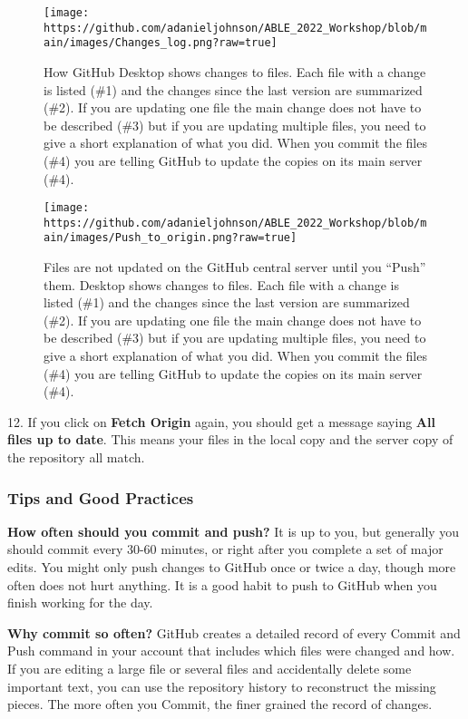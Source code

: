 \documentclass[
]{article}
\begin{document}
\begin{figure}
\centering
\texttt{[image: https://github.com/adanieljohnson/ABLE\_2022\_Workshop/blob/main/images/Changes\_log.png?raw=true]}
\caption{How GitHub Desktop shows changes to files. Each file with a
change is listed (\#1) and the changes since the last version are
summarized (\#2). If you are updating one file the main change does not
have to be described (\#3) but if you are updating multiple files, you
need to give a short explanation of what you did. When you commit the
files (\#4) you are telling GitHub to update the copies on its main
server (\#4).}
\end{figure}

\begin{figure}
\centering
\texttt{[image: https://github.com/adanieljohnson/ABLE\_2022\_Workshop/blob/main/images/Push\_to\_origin.png?raw=true]}
\caption{Files are not updated on the GitHub central server until you
``Push'' them. Desktop shows changes to files. Each file with a change
is listed (\#1) and the changes since the last version are summarized
(\#2). If you are updating one file the main change does not have to be
described (\#3) but if you are updating multiple files, you need to give
a short explanation of what you did. When you commit the files (\#4) you
are telling GitHub to update the copies on its main server (\#4).}
\end{figure}

12. If you click on \textbf{Fetch Origin} again, you should get a
message saying \textbf{All files up to date}. This means your files in
the local copy and the server copy of the repository all match.

\hypertarget{tips-and-good-practices}{%
\subsubsection{Tips and Good Practices}\label{tips-and-good-practices}}

\textbf{How often should you commit and push?} It is up to you, but
generally you should commit every 30-60 minutes, or right after you
complete a set of major edits. You might only push changes to GitHub
once or twice a day, though more often does not hurt anything. It is a
good habit to push to GitHub when you finish working for the day.

\textbf{Why commit so often?} GitHub creates a detailed record of every
Commit and Push command in your account that includes which files were
changed and how. If you are editing a large file or several files and
accidentally delete some important text, you can use the repository
history to reconstruct the missing pieces. The more often you Commit,
the finer grained the record of changes.
\end{document}
